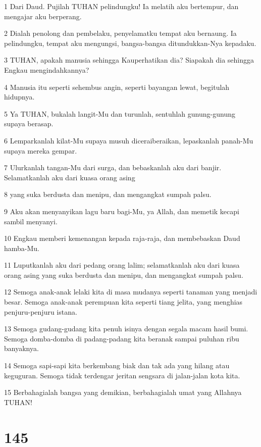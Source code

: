 \par 1 Dari Daud. Pujilah TUHAN pelindungku! Ia melatih aku bertempur, dan mengajar aku berperang.
\par 2 Dialah penolong dan pembelaku, penyelamatku tempat aku bernaung. Ia pelindungku, tempat aku mengungsi, bangsa-bangsa ditundukkan-Nya kepadaku.
\par 3 TUHAN, apakah manusia sehingga Kauperhatikan dia? Siapakah dia sehingga Engkau mengindahkannya?
\par 4 Manusia itu seperti sehembus angin, seperti bayangan lewat, begitulah hidupnya.
\par 5 Ya TUHAN, bukalah langit-Mu dan turunlah, sentuhlah gunung-gunung supaya berasap.
\par 6 Lemparkanlah kilat-Mu supaya musuh diceraiberaikan, lepaskanlah panah-Mu supaya mereka gempar.
\par 7 Ulurkanlah tangan-Mu dari surga, dan bebaskanlah aku dari banjir. Selamatkanlah aku dari kuasa orang asing
\par 8 yang suka berdusta dan menipu, dan mengangkat sumpah palsu.
\par 9 Aku akan menyanyikan lagu baru bagi-Mu, ya Allah, dan memetik kecapi sambil menyanyi.
\par 10 Engkau memberi kemenangan kepada raja-raja, dan membebaskan Daud hamba-Mu.
\par 11 Luputkanlah aku dari pedang orang lalim; selamatkanlah aku dari kuasa orang asing yang suka berdusta dan menipu, dan mengangkat sumpah palsu.
\par 12 Semoga anak-anak lelaki kita di masa mudanya seperti tanaman yang menjadi besar. Semoga anak-anak perempuan kita seperti tiang jelita, yang menghias penjuru-penjuru istana.
\par 13 Semoga gudang-gudang kita penuh isinya dengan segala macam hasil bumi. Semoga domba-domba di padang-padang kita beranak sampai puluhan ribu banyaknya.
\par 14 Semoga sapi-sapi kita berkembang biak dan tak ada yang hilang atau keguguran. Semoga tidak terdengar jeritan sengsara di jalan-jalan kota kita.
\par 15 Berbahagialah bangsa yang demikian, berbahagialah umat yang Allahnya TUHAN!

\chapter{145}

